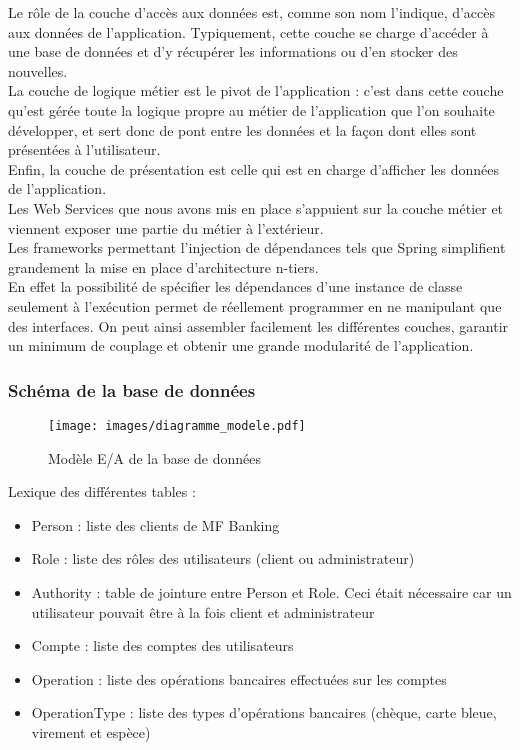 Le rôle de la couche d'accès aux données est, comme son nom l'indique, d'accès aux données de l'application. Typiquement, cette couche se charge d'accéder à une base de données et d'y récupérer les informations ou d'en stocker des nouvelles.\\
 
La couche de logique métier est le pivot de l'application : c'est dans cette couche qu'est gérée toute la logique propre au métier de l'application que l'on souhaite développer, et sert donc de pont entre les données et la façon dont elles sont présentées à l'utilisateur.\\

Enfin, la couche de présentation est celle qui est en charge d'afficher les données de l'application.\\
 
Les Web Services que nous avons mis en place s'appuient sur la couche métier et viennent exposer une partie du métier à l'extérieur.\\
 
Les frameworks permettant l'injection de dépendances tels que Spring simplifient grandement la mise en place d'architecture n-tiers.\\
En effet la possibilité de spécifier les dépendances d'une instance de classe seulement à l'exécution permet de réellement programmer en ne manipulant que des interfaces. On peut ainsi assembler facilement les différentes couches, garantir un minimum de couplage et obtenir une grande modularité de l'application. 
 
\subsubsection{Schéma de la base de données}
	\begin{figure}[h!]
		\centering
			\texttt{[image: images/diagramme\_modele.pdf]} 
		\caption{Modèle E/A de la base de données}
	\end{figure}

Lexique des différentes tables :
\begin{itemize}
	\item Person : liste des clients de MF Banking
	\item Role : liste des rôles des utilisateurs (client ou administrateur)
	\item Authority : table de jointure entre Person et Role. Ceci était nécessaire car un utilisateur pouvait être à la fois client et administrateur  
	\item Compte : liste des comptes des utilisateurs
	\item Operation : liste des opérations bancaires effectuées sur les comptes
	\item OperationType : liste des types d'opérations bancaires (chèque, carte bleue, virement et espèce)
\end{itemize}

